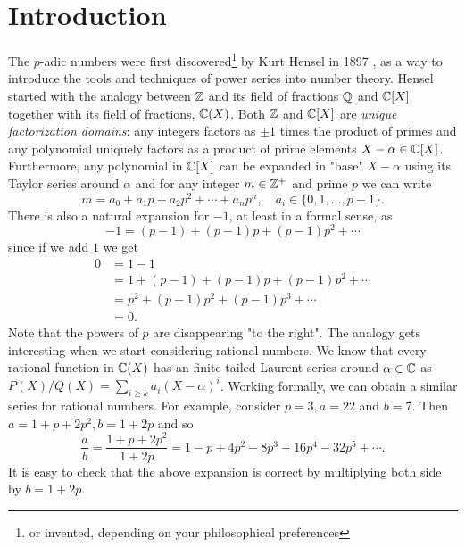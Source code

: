 \chapter{Introduction}
The $p$-adic numbers were first discovered\footnote{or invented, depending on your philosophical preferences} by Kurt Hensel in 1897 \cite{Gouvea_2013}, as a way to introduce the tools and techniques of power series into number theory.
Hensel started with the analogy between $\mathbb{Z}$ and its field of fractions $\mathbb{Q}$ and $\mathbb{C}[X]$ together with its field of fractions, $\mathbb{C}(X)$.
Both $\mathbb{Z}$ and $\mathbb{C}[X]$ are \textit{unique factorization domains}: any integers factors as $\pm1$ times the product of primes and any polynomial uniquely factors as a product of prime elements $X-\alpha\in\mathbb{C}[X]$.
Furthermore, any polynomial in $\mathbb{C}[X]$ can be expanded in "base" $X-\alpha$ using its Taylor series around $\alpha$ and for any integer $m\in\mathbb{Z}^+$ and prime $p$ we can write
\[m=a_0+a_1p+a_2p^2+\cdots+a_np^n,\quad a_i\in\{0,1,\dots, p-1\}.\]
There is also a natural expansion for $-1$, at least in a formal sense, as
\[-1=(p-1)+(p-1)p+(p-1)p^2+\cdots\]
since if we add $1$ we get
\begin{align*}
    0&=1-1\\
    &=1+(p-1)+(p-1)p+(p-1)p^2+\cdots\\
    &=p^2+(p-1)p^2+(p-1)p^3+\cdots\\
    &=0.
\end{align*}
Note that the powers of $p$ are disappearing "to the right".
The analogy gets interesting when we start considering rational numbers.
We know that every rational function in $\mathbb{C}(X)$ has an finite tailed Laurent series around $\alpha\in\mathbb{C}$ as
${P(X)}/{Q(X)}=\sum_{i\geq k}a_i(X-\alpha)^i$. Working formally, we can obtain a similar series for rational numbers.
For example, consider $p=3, a=22$ and $b=7$. Then $a=1+p+2p^2, b=1+2p$ and so
\begin{equation}\label{eq:p-adic-expansion}
    \frac{a}{b}=\frac{1+p+2p^2}{1+2p}=1-p+4 p^2-8 p^3+16 p^4-32 p^5+\cdots.
\end{equation}
It is easy to check that the above expansion is correct by multiplying both side by $b=1+2p$.

